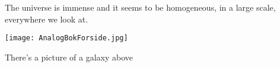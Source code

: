 \documentclass{article}
\begin{document}
The universe is immense and it seems to be homogeneous, 
in a large scale, everywhere we look at.

\texttt{[image: AnalogBokForside.jpg]}

There's a picture of a galaxy above
\end{document}
